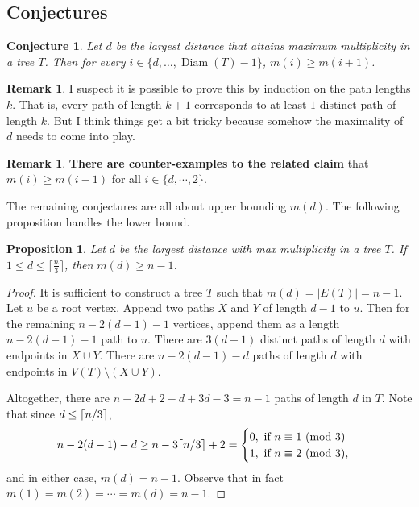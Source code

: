 \documentclass[12]{article}
\newcommand{\Mod}[1]{\ (\mathrm{mod}\ #1)}
\DeclarePairedDelimiter\ceil{\lceil}{\rceil}
\DeclareMathOperator{\diam}{Diam}
\newtheorem{prop}[thm]{Proposition}
\newtheorem{conj}[thm]{Conjecture}
\theoremstyle{definition}
\newtheorem{rem}[thm]{Remark}
\begin{document}
	\subsection{Conjectures}
	
	\begin{conj}
		Let $d$ be the largest distance that attains maximum multiplicity in a tree $T$.  Then for every $i \in \{d,\ldots, \diam(T)-1\}$, $m(i) \geq m(i+1)$.
	\end{conj}

	\begin{rem}
		I suspect it is possible to prove this by induction on the path lengths $k$.  That is, every path of length $k+1$ corresponds to at least $1$ distinct path of length $k$.  But I think things get a bit tricky because somehow the maximality of $d$ needs to come into play.
	\end{rem}

	\begin{rem}
		\textbf{There are counter-examples to the related claim} that $m(i) \geq m(i-1)$ for all $i \in \{d,\cdots,2\}$.
	\end{rem}

	The remaining conjectures are all about upper bounding $m(d)$.  The following proposition handles the lower bound.
	
	\begin{prop}
		Let $d$ be the largest distance with max multiplicity in a tree $T$.  If $1 \leq d \leq \lceil \frac{n}{3} \rceil$, then $m(d) \geq n-1$.
	\end{prop}

	\begin{proof}
		It is sufficient to construct a tree $T$ such that $m(d) = |E(T)| = n-1$.  Let $u$ be a root vertex.  Append two paths $X$ and $Y$ of length $d-1$ to $u$. Then for the remaining $n-2(d-1)-1$ vertices, append them as a length $n-2(d-1)-1$ path to $u$.  There are $3(d-1)$ distinct paths of length $d$ with endpoints in $X \cup Y$.  There are $n-2(d-1)-d$ paths of length $d$ with endpoints in $V(T) \setminus (X \cup Y)$. 
		
		Altogether, there are $n-2d+2-d + 3d-3 = n-1$ paths of length $d$ in $T$.  Note that since $d \leq \ceil{n/3}$, 
		$$n-2(d-1)-d \geq n-3\ceil{n/3}+2 = \begin{cases}
			0, \text{ if } n \equiv 1 \Mod{3}	\\
			1, \text{ if } n \equiv 2 \Mod{3},
		\end{cases}$$ and in either case, $m(d) = n-1$.  Observe that in fact $m(1) = m(2) = \cdots = m(d) = n-1$. \qedhere
	\end{proof}
	
\end{document}
